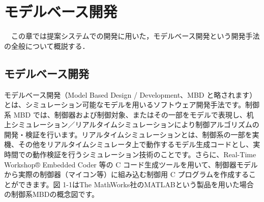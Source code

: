\chapter{モデルベース開発}
　この章では提案システムでの開発に用いた，モデルベース開発という開発手法の全般について概説する．

\section{モデルベース開発}
モデルベース開発（Model Based Design / Development、MBD と略されます）とは、シミュレーション可能なモデルを用いるソフトウェア開発手法です。制御系 MBD では、制御器および制御対象、またはその一部をモデルで表現し、机上シミュレーション／リアルタイムシミュレーションにより制御アルゴリズムの開発・検証を行います。リアルタイムシミュレーションとは、制御系の一部を実機、その他をリアルタイムシミュレータ上で動作するモデル生成コードとし、実時間での動作検証を行うシミュレーション技術のことです。さらに、Real-Time Workshop® Embedded Coder 等の C コード生成ツールを用いて、制御器モデルから実際の制御器（マイコン等）に組み込む制御用 C プログラムを作成することができます。図 1-1はThe MathWorks社のMATLABという製品を用いた場合の制御系MBDの概念図です。

